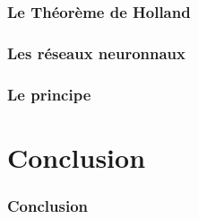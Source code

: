\documentclass[10pt]{beamer}
\begin{document}
\begin{frame}
  \frametitle{Le Théorème de Holland}
  \end{frame}

\subsubsection{Les réseaux neuronnaux}

\begin{frame}
  \frametitle{Le principe}
  \end{frame}

\section{Conclusion}

\begin{frame}
  \frametitle{Conclusion}
  \end{frame}
\end{document}
